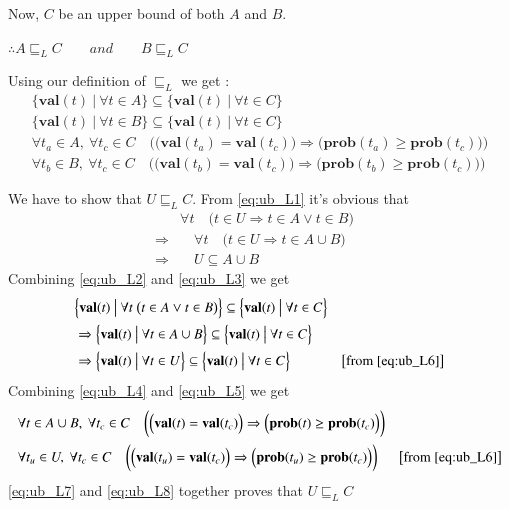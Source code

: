 \documentclass[final,3p, review, times]{Elsevier/elsarticle}
\begin{document}
Now, $C$ be an upper bound of both $A$ and $B$.

$\therefore A\sqsubseteq_L C\qquad and\qquad B\sqsubseteq_L C$

Using our definition of $\sqsubseteq_L$ we get :
\begin{align}
&\Big\{\mathbf{val}(t)\ \big|\ \forall t\in A\Big\}\subseteq\Big\{\mathbf{val}(t)\ \big|\ \forall t\in C\Big\}&\label{eq:ub_L2}\\
&\Big\{\mathbf{val}(t)\ \big|\ \forall t\in B\Big\}\subseteq\Big\{\mathbf{val}(t)\ \big|\ \forall t\in C\Big\}&\label{eq:ub_L3}\\
&\forall t_a\in A,\ \forall t_c\in C\quad\bigg(\Big(\mathbf{val}(t_a)=\mathbf{val}(t_c)\Big)\Rightarrow\Big(\mathbf{prob}(t_a)\geq\mathbf{prob}(t_c)\Big)\bigg)&\label{eq:ub_L4}\\
&\forall t_b\in B,\ \forall t_c\in C\quad\bigg(\Big(\mathbf{val}(t_b)=\mathbf{val}(t_c)\Big)\Rightarrow\Big(\mathbf{prob}(t_b)\geq\mathbf{prob}(t_c)\Big)\bigg)&\label{eq:ub_L5}
\end{align}

We have to show that $U\sqsubseteq_L C$. From \ref{eq:ub_L1} it's obvious that
\begin{align}
&\forall t\quad\Big(t\in U\Rightarrow t\in A\lor t\in B\Big)\nonumber\\
\Rightarrow&\quad\forall t\quad\Big(t\in U\Rightarrow t\in A\cup B\Big)&\nonumber\\
\Rightarrow&\quad U\subseteq A\cup B&\label{eq:ub_L6}
\end{align}
Combining \ref{eq:ub_L2} and \ref{eq:ub_L3} we get
\begin{align}
&\Big\{\mathbf{val}(t)\ \big|\ \forall t\ \big(t\in A\lor t\in B\big)\Big\}\subseteq\Big\{\mathbf{val}(t)\ \big|\ \forall t\in C\Big\}&\nonumber\\
&\Rightarrow\Big\{\mathbf{val}(t)\ \big|\ \forall t\in A\cup B\Big\}\subseteq\Big\{\mathbf{val}(t)\ \big|\ \forall t\in C\Big\}&\nonumber\\
&\Rightarrow\Big\{\mathbf{val}(t)\ \big|\ \forall t\in U\Big\}\subseteq\Big\{\mathbf{val}(t)\ \big|\ \forall t\in C\Big\}&\big[\text{from}\ \ref{eq:ub_L6}\big]\label{eq:ub_L7}
\end{align}
Combining \ref{eq:ub_L4} and \ref{eq:ub_L5} we get
\begin{align}
&\forall t\in A\cup B,\ \forall t_c\in C\quad\bigg(\Big(\mathbf{val}(t)=\mathbf{val}(t_c)\Big)\Rightarrow\Big(\mathbf{prob}(t)\geq\mathbf{prob}(t_c)\Big)\bigg)&\nonumber\\
&\forall t_u\in U,\ \forall t_c\in C\quad\bigg(\Big(\mathbf{val}(t_u)=\mathbf{val}(t_c)\Big)\Rightarrow\Big(\mathbf{prob}(t_u)\geq\mathbf{prob}(t_c)\Big)\bigg)&\big[\text{from}\ \ref{eq:ub_L6}\big]\label{eq:ub_L8}
\end{align}
\ref{eq:ub_L7} and \ref{eq:ub_L8} together proves that $U\sqsubseteq_L C$
\end{document}
